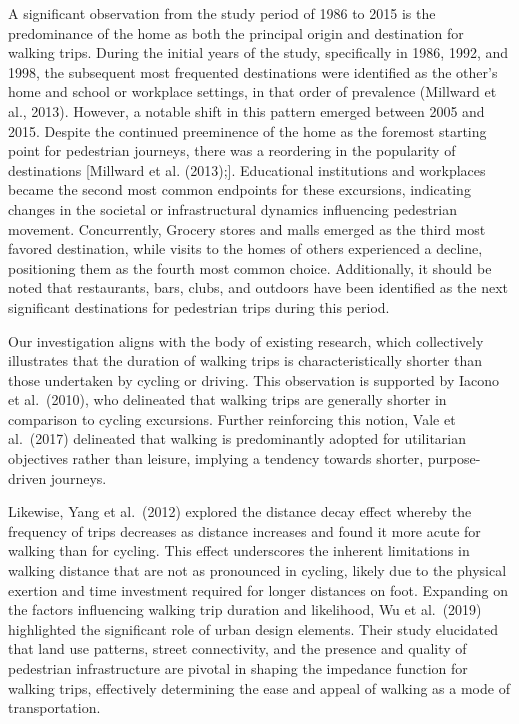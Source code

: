 \documentclass[
11pt, %
oneside, %
english, %
singlespacing, %
]{macthesis} %
\begin{document}
A significant observation from the study period of 1986 to 2015 is the predominance of the home as both the principal origin and destination for walking trips. During the initial years of the study, specifically in 1986, 1992, and 1998, the subsequent most frequented destinations were identified as the other's home and school or workplace settings, in that order of prevalence (Millward et al., 2013). However, a notable shift in this pattern emerged between 2005 and 2015. Despite the continued preeminence of the home as the foremost starting point for pedestrian journeys, there was a reordering in the popularity of destinations {[}Millward et al. (2013);{]}. Educational institutions and workplaces became the second most common endpoints for these excursions, indicating changes in the societal or infrastructural dynamics influencing pedestrian movement. Concurrently, Grocery stores and malls emerged as the third most favored destination, while visits to the homes of others experienced a decline, positioning them as the fourth most common choice. Additionally, it should be noted that restaurants, bars, clubs, and outdoors have been identified as the next significant destinations for pedestrian trips during this period.

Our investigation aligns with the body of existing research, which collectively illustrates that the duration of walking trips is characteristically shorter than those undertaken by cycling or driving. This observation is supported by Iacono et al.~(2010), who delineated that walking trips are generally shorter in comparison to cycling excursions. Further reinforcing this notion, Vale et al.~(2017) delineated that walking is predominantly adopted for utilitarian objectives rather than leisure, implying a tendency towards shorter, purpose-driven journeys.

Likewise, Yang et al.~(2012) explored the distance decay effect whereby the frequency of trips decreases as distance increases and found it more acute for walking than for cycling. This effect underscores the inherent limitations in walking distance that are not as pronounced in cycling, likely due to the physical exertion and time investment required for longer distances on foot. Expanding on the factors influencing walking trip duration and likelihood, Wu et al.~(2019) highlighted the significant role of urban design elements. Their study elucidated that land use patterns, street connectivity, and the presence and quality of pedestrian infrastructure are pivotal in shaping the impedance function for walking trips, effectively determining the ease and appeal of walking as a mode of transportation.
\end{document}
